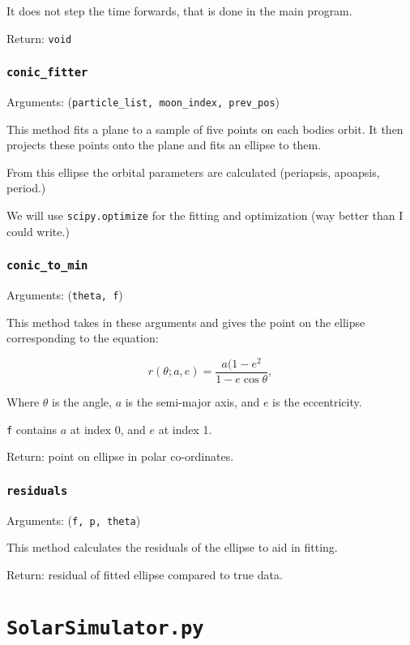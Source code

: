 \documentclass[a4paper, 11pt, british, left=1in, right=1in, top=0.3in, bottom=1in]{article}
\begin{document}
	It does not step the time forwards, that is done in the main program.
	
	Return: \texttt{void}
	
	\subsubsection{\texttt{conic\_fitter}}
	
	Arguments: (\texttt{particle\_list, moon\_index, prev\_pos})
	
	This method fits a plane to a sample of  five points on each bodies orbit. It then projects these points onto the plane and fits an ellipse to them. 
	
	From this ellipse the orbital parameters are calculated (periapsis, apoapsis, period.)
	
	We will use \texttt{scipy.optimize} for the fitting and optimization (way better than I could write.)
	
	
	\subsubsection{\texttt{conic\_to\_min}}
	Arguments: (\texttt{theta, f})
	
	This method takes in these arguments and gives the point on the ellipse corresponding to the equation: 
	
	
	$$r(\theta;a, e) = \frac{a(1-e^2}{1-e\cos\theta},$$
	
	Where $\theta$ is the angle, $a$ is the semi-major axis, and $e$ is the eccentricity.
	
	\texttt{f} contains $a$ at index 0, and $e$ at index 1.
	
	Return: point on ellipse in polar co-ordinates. 
	
	\subsubsection{\texttt{residuals}}
	
	Arguments: (\texttt{f, p, theta})
	
	This method calculates the residuals of the ellipse to aid in fitting. 
	
	Return: residual of fitted ellipse compared to true data.
	
	\section{\texttt{SolarSimulator.py}}
	
\end{document}
